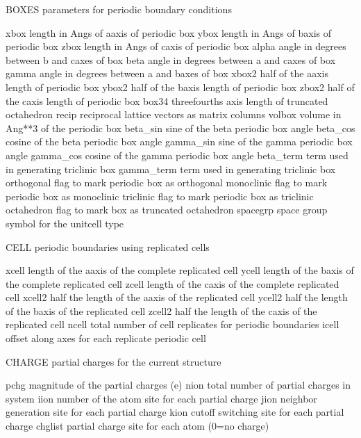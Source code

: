 \documentclass[letterpaper,11pt,english]{sphinxmanual}
\begin{document}
BOXES   parameters for periodic boundary conditions

xbox    length in Angs of a\sphinxhyphen{}axis of periodic box
ybox    length in Angs of b\sphinxhyphen{}axis of periodic box
zbox    length in Angs of c\sphinxhyphen{}axis of periodic box
alpha   angle in degrees between b\sphinxhyphen{} and c\sphinxhyphen{}axes of box
beta    angle in degrees between a\sphinxhyphen{} and c\sphinxhyphen{}axes of box
gamma   angle in degrees between a\sphinxhyphen{} and b\sphinxhyphen{}axes of box
xbox2   half of the a\sphinxhyphen{}axis length of periodic box
ybox2   half of the b\sphinxhyphen{}axis length of periodic box
zbox2   half of the c\sphinxhyphen{}axis length of periodic box
box34   three\sphinxhyphen{}fourths axis length of truncated octahedron
recip   reciprocal lattice vectors as matrix columns
volbox  volume in Ang**3 of the periodic box
beta\_sin        sine of the beta periodic box angle
beta\_cos        cosine of the beta periodic box angle
gamma\_sin       sine of the gamma periodic box angle
gamma\_cos       cosine of the gamma periodic box angle
beta\_term       term used in generating triclinic box
gamma\_term      term used in generating triclinic box
orthogonal      flag to mark periodic box as orthogonal
monoclinic      flag to mark periodic box as monoclinic
triclinic       flag to mark periodic box as triclinic
octahedron      flag to mark box as truncated octahedron
spacegrp        space group symbol for the unitcell type

CELL    periodic boundaries using replicated cells

xcell   length of the a\sphinxhyphen{}axis of the complete replicated cell
ycell   length of the b\sphinxhyphen{}axis of the complete replicated cell
zcell   length of the c\sphinxhyphen{}axis of the complete replicated cell
xcell2  half the length of the a\sphinxhyphen{}axis of the replicated cell
ycell2  half the length of the b\sphinxhyphen{}axis of the replicated cell
zcell2  half the length of the c\sphinxhyphen{}axis of the replicated cell
ncell   total number of cell replicates for periodic boundaries
icell   offset along axes for each replicate periodic cell

CHARGE  partial charges for the current structure

pchg    magnitude of the partial charges (e\sphinxhyphen{})
nion    total number of partial charges in system
iion    number of the atom site for each partial charge
jion    neighbor generation site for each partial charge
kion    cutoff switching site for each partial charge
chglist partial charge site for each atom (0=no charge)
\end{document}

